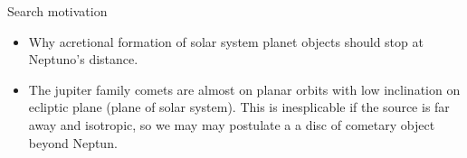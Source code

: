 \begin{frame}{Search motivation}
\begin{itemize}
\item Why acretional formation of solar system planet objects should stop at Neptuno's distance.
\item The jupiter family comets are almost on planar orbits with low inclination on ecliptic plane (plane of solar system). This is inesplicable if the source is far away and isotropic, so we may may postulate a a disc of cometary object beyond Neptun.
\end{itemize}
\end{frame}
